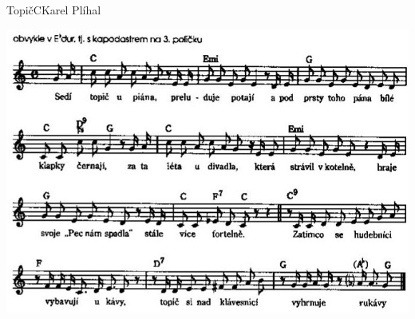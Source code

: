 \setcounter{page}{88}
\begin{song}{Topič}{C}{Karel Plíhal}

\includegraphics[width=\textwidth]{noty/a_topič} \end{song} \pagebreak
